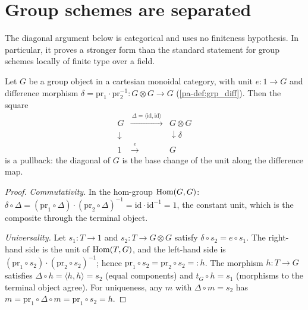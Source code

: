 \section{Group schemes are separated}
\label{pa-sec:group_separated}

The diagonal argument below is categorical and uses no finiteness hypothesis.
In particular, it proves a stronger form than the standard statement for group
schemes locally of finite type over a field.

\begin{theorem}
  \label{pa-thm:grp_diagonal_pullback}
  \leanok

  Let \(G\) be a group object in a cartesian monoidal category, with unit
  \(e : 1 \to G\) and difference morphism
  \(\delta = \mathrm{pr}_1 \cdot \mathrm{pr}_2^{-1} : G \otimes G \to G\)
  (\ref{pa-def:grp_diff}). Then the square
  \[
    \begin{array}{ccc}
      G & \xrightarrow{\ \Delta = \langle \mathrm{id}, \mathrm{id}\rangle\ }
        & G \otimes G \\
      \downarrow & & \downarrow \delta \\
      1 & \xrightarrow{\ e\ } & G
    \end{array}
  \]
  is a pullback: the diagonal of \(G\) is the base change of the unit along
  the difference map.
\end{theorem}
\begin{proof}
  \leanok
  \emph{Commutativity.} In the hom-group \(\operatorname{Hom}(G, G)\):
  \(\delta \circ \Delta = (\mathrm{pr}_1 \circ \Delta)\cdot(\mathrm{pr}_2
  \circ \Delta)^{-1} = \mathrm{id} \cdot \mathrm{id}^{-1} = 1\), the constant
  unit, which is the composite through the terminal object.

  \emph{Universality.} Let \(s_1 : T \to 1\) and \(s_2 : T \to G \otimes G\)
  satisfy \(\delta \circ s_2 = e \circ s_1\). The right-hand side is the unit
  of \(\operatorname{Hom}(T, G)\), and the left-hand side is
  \((\mathrm{pr}_1 \circ s_2)\cdot(\mathrm{pr}_2 \circ s_2)^{-1}\); hence
  \(\mathrm{pr}_1 \circ s_2 = \mathrm{pr}_2 \circ s_2 =: h\). The morphism
  \(h : T \to G\) satisfies \(\Delta \circ h = \langle h, h \rangle = s_2\)
  (equal components) and \(t_G \circ h = s_1\) (morphisms to the terminal
  object agree). For uniqueness, any \(m\) with \(\Delta \circ m = s_2\) has
  \(m = \mathrm{pr}_1 \circ \Delta \circ m = \mathrm{pr}_1 \circ s_2 = h\).
\end{proof}


